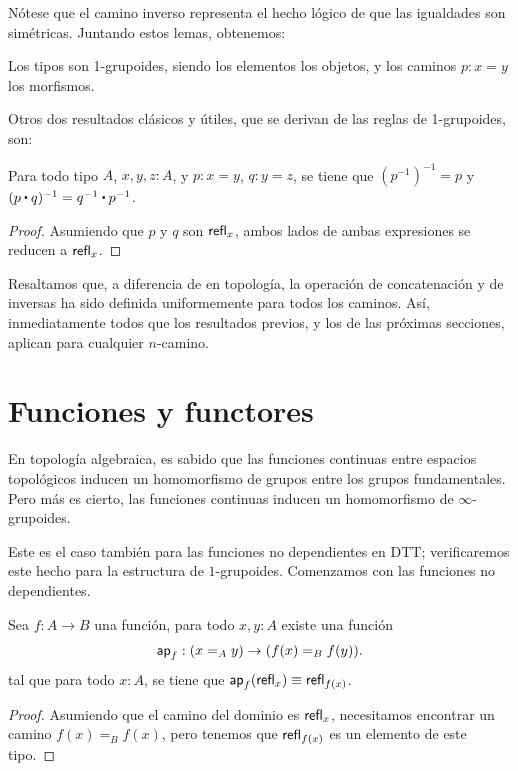 \documentclass[../main.tex]{subfiles}
\begin{document}
N\'otese que el camino inverso representa el hecho l\'ogico de que las igualdades son sim\'etricas.
Juntando estos lemas, obtenemos:

\begin{theorem}
  Los tipos son 1-grupoides, siendo los elementos los objetos, y los caminos $p:x=y$ los morfismos.
\end{theorem}

Otros dos resultados clásicos y útiles, que se derivan de las reglas de 1-grupoides, son:
\begin{lemma}
  Para todo tipo $A$, $x,y,z:A$, y $p:x=y$, $q:y=z$, se tiene que $(p^{-1})^{-1}=p$ y $(p \ct q )^{-1} = q^{-1} \ct p^{-1}$.
\end{lemma}
\begin{proof}
  Asumiendo que $p$ y $q$ son $\refl{x}$, ambos lados de ambas expresiones se reducen a $\refl{x}$.
\end{proof}

Resaltamos que, a diferencia de en topolog\'ia, la operación de concatenaci\'on y de inversas ha sido definida uniformemente para todos los caminos.
As\'i, inmediatamente todos que los resultados previos, y los de las pr\'oximas secciones, aplican para cualquier $n$-camino.

\section{Funciones y functores}
En topolog\'ia algebraica, es sabido que las funciones continuas entre espacios topológicos inducen un homomorfismo de grupos entre los grupos fundamentales.
Pero m\'as es cierto, las funciones continuas inducen un homomorfismo de $\infty$-grupoides.

Este es el caso tambi\'en para las funciones no dependientes en DTT; verificaremos este hecho para la estructura de $1$-grupoides.
Comenzamos con las funciones no dependientes.

\begin{lemma}\label{aplema}
  Sea $f:A \to B$ una funci\'on, para todo $x,y:A$ existe una función
  \begin{equation*}
    \apfunc f : (\id[A] x y) \to (\id[B] {f(x)} {f(y)}).
  \end{equation*}
  tal que para todo $x:A$, se tiene que $\apfunc{f}(\refl{x})\jdeq \refl{f(x)}$.
\end{lemma}
\begin{proof}
  Asumiendo que el camino del dominio es $\refl{x}$, necesitamos encontrar un camino $f(x)=_B f(x)$, pero tenemos que $\refl{f(x)}$ es un elemento de este tipo.
\end{proof}
\end{document}
